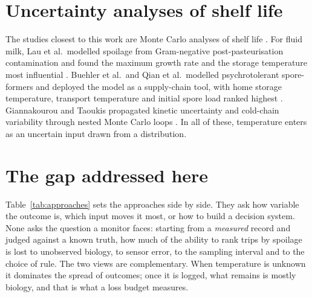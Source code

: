 \documentclass[11pt,a4paper,twoside,openany]{book}
\theoremstyle{plain}\newtheorem{proposition}{Proposition}\newtheorem{corollary}{Corollary}
\theoremstyle{definition}\newtheorem{definition}{Definition}[chapter]
\begin{document}
\section{Uncertainty analyses of shelf life}
The studies closest to this work are Monte Carlo analyses of shelf life \cite{nauta2000}. For fluid milk, Lau et al.\ modelled spoilage from Gram-negative post-pasteurisation contamination and found the maximum growth rate and the storage temperature most influential \cite{lau2022}. Buehler et al.\ and Qian et al.\ modelled psychrotolerant spore-formers and deployed the model as a supply-chain tool, with home storage temperature, transport temperature and initial spore load ranked highest \cite{buehler2018,qian2023}. Giannakourou and Taoukis propagated kinetic uncertainty and cold-chain variability through nested Monte Carlo loops \cite{giannakourou2020}. In all of these, temperature enters as an uncertain input drawn from a distribution.

\section{The gap addressed here}
Table~\ref{tab:approaches} sets the approaches side by side. They ask how variable the outcome is, which input moves it most, or how to build a decision system. None asks the question a monitor faces: starting from a \emph{measured} record and judged against a known truth, how much of the ability to rank trips by spoilage is lost to unobserved biology, to sensor error, to the sampling interval and to the choice of rule. The two views are complementary. When temperature is unknown it dominates the spread of outcomes; once it is logged, what remains is mostly biology, and that is what a loss budget measures.
\end{document}
